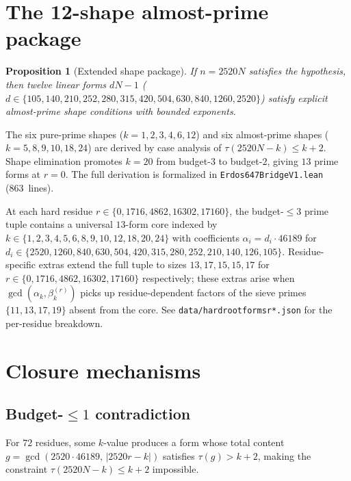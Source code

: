 \documentclass[11pt]{article}
\renewcommand{\_}{\origunderscore\allowbreak}
\newtheorem{proposition}[theorem]{Proposition}
\theoremstyle{definition}
\theoremstyle{remark}
\begin{document}
\section{The 12-shape almost-prime package}\label{sec:shapes}

\begin{proposition}[Extended shape package]
If $n=2520N$ satisfies the hypothesis, then twelve linear forms $dN-1$
($d\in\{105,140,210,252,280,315,420,504,630,840,1260,2520\}$) satisfy
explicit almost-prime shape conditions with bounded exponents.
\end{proposition}

The six pure-prime shapes ($k=1,2,3,4,6,12$) and six almost-prime
shapes ($k=5,8,9,10,18,24$) are derived by case analysis of
$\tau(2520N-k)\le k+2$. Shape elimination promotes $k=20$ from
budget-$3$ to budget-$2$, giving $13$ prime forms at $r=0$.
The full derivation is formalized in \texttt{Erdos647BridgeV1.lean}
(863~lines).

At each hard residue $r\in\{0,1716,4862,16302,17160\}$, the
budget-$\le 3$ prime tuple contains a universal $13$-form core
indexed by $k\in\{1,2,3,4,5,6,8,9,10,12,18,20,24\}$ with
coefficients $\alpha_i=d_i\cdot 46189$ for $d_i\in\{2520,1260,
840,630,504,420,315,280,252,210,140,126,105\}$. Residue-specific
extras extend the full tuple to sizes $13,17,15,15,17$ for
$r\in\{0,1716,4862,16302,17160\}$ respectively; these extras
arise when $\gcd(\alpha_k,\beta_k^{(r)})$ picks up residue-dependent
factors of the sieve primes $\{11,13,17,19\}$ absent from the
core. See \texttt{data/hard\_root\_forms\_r*.json} for the
per-residue breakdown.

\section{Closure mechanisms}\label{sec:closure}

\subsection{Budget-$\le 1$ contradiction}

For $72$ residues, some $k$-value produces a form whose total content
$g=\gcd(2520\cdot 46189,\,|2520r-k|)$ satisfies $\tau(g)>k+2$,
making the constraint $\tau(2520N-k)\le k+2$ impossible.
\end{document}
